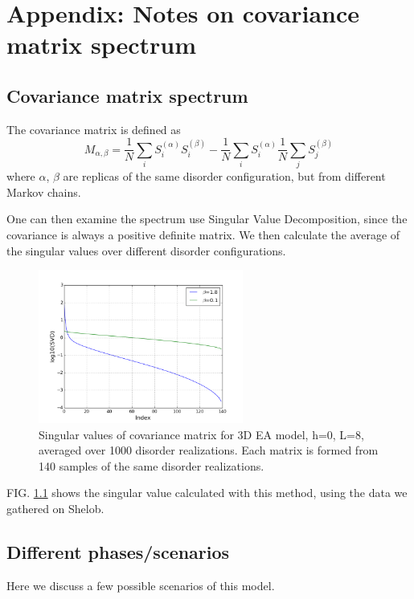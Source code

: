 \chapter{Appendix: Notes on covariance matrix spectrum}
\section{Covariance matrix spectrum}
The covariance matrix is defined as 
\[
M_{\alpha,\beta}=\frac{1}{N}\sum_iS_i^{(\alpha)}S_i^{(\beta)}-
\frac{1}{N}\sum_iS_i^{(\alpha)}\frac{1}{N}\sum_jS_j^{(\beta)}
\]
where $\alpha$, $\beta$ are replicas of the same disorder configuration, 
but from different Markov chains.

One can then examine the spectrum use Singular Value Decomposition, since
the covariance is always a positive definite matrix. 
We then calculate the average of the singular values over different disorder 
configurations. 

\begin{figure}[ht]
  \centering
  \includegraphics[width=0.6\textwidth]{img/matrix/svd_data.png}
  \caption{Singular values of covariance matrix for 3D EA model, h=0, L=8, 
averaged over 1000 disorder realizations. 
Each matrix is formed from 140 samples of the same disorder realizations.}
  \label{fig:exp}
\end{figure}

FIG. \ref{fig:exp} shows the singular value calculated with this method, using
the data we gathered on Shelob.

\section{Different phases/scenarios}
Here we discuss a few possible scenarios of this model.

